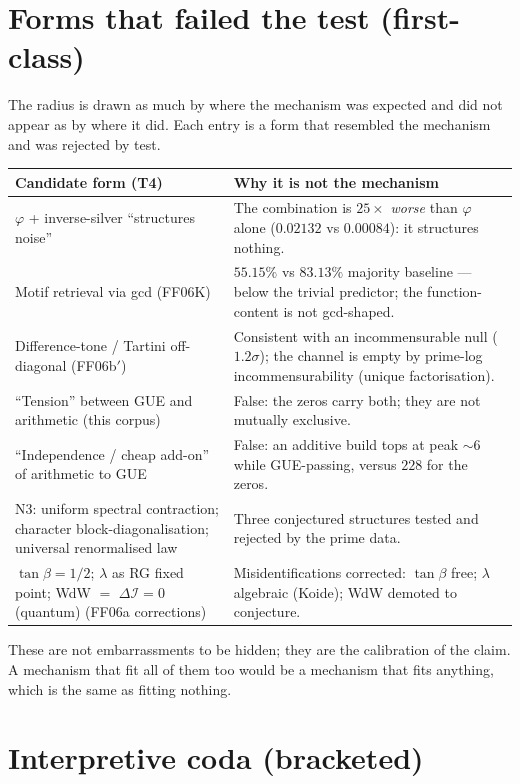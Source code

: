 \documentclass[11pt,a4paper]{article}
\newcommand{\dI}{\Delta\mathcal{I}}
\newcommand{\Tf}{\textsf{T4}}
\newcommand{\paper}[1]{\textsf{#1}}
\theoremstyle{definition}
\theoremstyle{plain}
\begin{document}
\section{Forms that failed the test (first-class)}\label{sec:negatives}

The radius is drawn as much by where the mechanism was expected and did not appear as by where it did.
Each entry is a form that resembled the mechanism and was rejected by test.

\begin{longtable}{p{} p{}}
\toprule
\textbf{Candidate form (\Tf)} & \textbf{Why it is not the mechanism} \\
\midrule
\endhead
$\varphi$ + inverse-silver ``structures noise'' & The combination is $25\times$ \emph{worse} than
$\varphi$ alone ($0.02132$ vs $0.00084$): it structures nothing. \\
Motif retrieval via gcd (\paper{FF06K}) & $55.15\%$ vs $83.13\%$ majority baseline --- below the
trivial predictor; the function-content is not gcd-shaped. \\
Difference-tone / Tartini off-diagonal (\paper{FF06b$'$}) & Consistent with an incommensurable null
($1.2\sigma$); the channel is empty by prime-log incommensurability (unique factorisation). \\
``Tension'' between GUE and arithmetic (this corpus) & False: the zeros carry both; they are not
mutually exclusive. \\
``Independence / cheap add-on'' of arithmetic to GUE & False: an additive build tops at peak
$\sim$$6$ while GUE-passing, versus $228$ for the zeros. \\
N3: uniform spectral contraction; character block-diagonalisation; universal renormalised law &
Three conjectured structures tested and rejected by the prime data. \\
$\tan\beta=1/2$; $\lambda$ as RG fixed point; WdW $=$ $\dI{=}0$ (quantum) (\paper{FF06a} corrections)
& Misidentifications corrected: $\tan\beta$ free; $\lambda$ algebraic (Koide); WdW demoted to
conjecture. \\
\bottomrule
\end{longtable}

\noindent These are not embarrassments to be hidden; they are the calibration of the claim. A
mechanism that fit all of them too would be a mechanism that fits anything, which is the same as
fitting nothing.

\section{Interpretive coda (bracketed)}\label{sec:coda}
\end{document}
